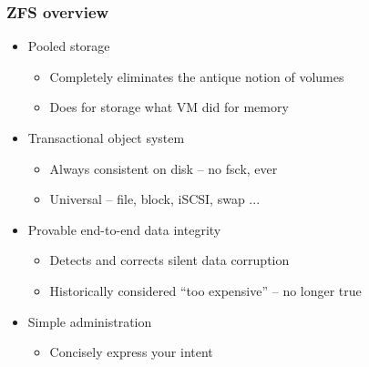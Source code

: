 \begin{frame}[fragile]
    \frametitle{ZFS overview}
    \begin{itemize}
        \item Pooled storage
        \begin{itemize}
            \item Completely eliminates the antique notion of volumes
            \item Does for storage what VM did for memory
        \end{itemize}
        \item Transactional object system
        \begin{itemize}
            \item Always consistent on disk – no fsck, ever
            \item Universal – file, block, iSCSI, swap ...
        \end{itemize}
        \item Provable end-to-end data integrity
        \begin{itemize}
            \item Detects and corrects silent data corruption
            \item Historically considered “too expensive” – no longer true
        \end{itemize}
        \item Simple administration
        \begin{itemize}
            \item Concisely express your intent
        \end{itemize}
    \end{itemize}
\end{frame}
% 
% 
